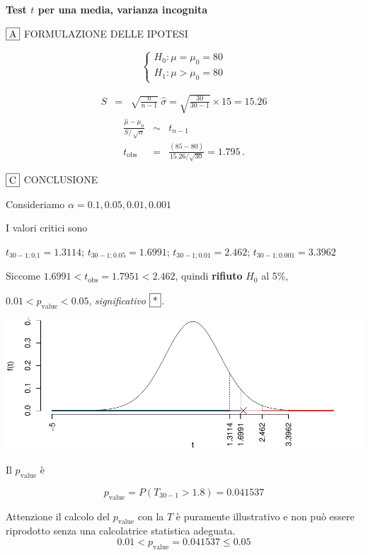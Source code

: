 \documentclass[
  11pt,
]{book}
\theoremstyle{mytheoremstyle}
\theoremstyle{mydefstyle}
\newenvironment{sol}
  {
  \begin{tcolorbox}[enhanced,breakable,arc=0.1mm,boxrule=1pt,colback=white,colframe=iblue,
  title=\bf \fontfamily{lmss}\selectfont \hspace{.5 cm} Soluzione,drop fuzzy shadow]

}{
\end{tcolorbox}
  }
\begin{document}
\begin{sol}
\textbf{Test \(t\) per una media, varianza incognita}

\(\fbox{A}\) FORMULAZIONE DELLE IPOTESI

\[\begin{cases}
   H_0: \mu = \mu_0=80 \\
   H_1: \mu > \mu_0=80 
   \end{cases}\]

\begin{eqnarray*}
   S    &=& \sqrt{\frac{n} {n-1}}\ \widehat{\sigma} 
   =  \sqrt{\frac{ 30 } { 30 -1}} \times  15  =  15.26 
   \end{eqnarray*}
\begin{eqnarray*}
   \frac{\hat\mu - \mu_{0}} {S/\,\sqrt{n}}&\sim&t_{n-1}\\
   t_{\text{obs}}
   &=& \frac{ ( 85 -  80 )} { 15.26 /\sqrt{ 30 }}
   =   1.795 \, .
   \end{eqnarray*}

\(\fbox{C}\) CONCLUSIONE

Consideriamo \(\alpha=0.1, 0.05, 0.01, 0.001\)

I valori critici sono

\(t_{30-1;0.1}=1.3114\); \(t_{30-1;0.05}=1.6991\); \(t_{30-1;0.01}=2.462\); \(t_{30-1;0.001}=3.3962\)

Siccome \(1.6991<t_\text{obs}=1.7951<2.462\), quindi \textbf{rifiuto} \(H_0\) al 5\%,

\(0.01<p_\text{value}<0.05\), \emph{significativo} \(\fbox{*}\).

\begin{center}\includegraphics{Esami_passati_con_soluzioni_files/figure-latex/2024-27,-1} \end{center}

Il \(p_{\text{value}}\) è

\[ p_{\text{value}} = P(T_{30-1}>1.8)=0.041537 \]

Attenzione il calcolo del \(p_\text{value}\) con la \(T\) è puramente illustrativo e non può essere riprodotto senza una calcolatrice statistica adeguata.\[
 0.01 < p_\text{value}= 0.041537 \leq 0.05 
\]

\end{sol}
\end{document}
